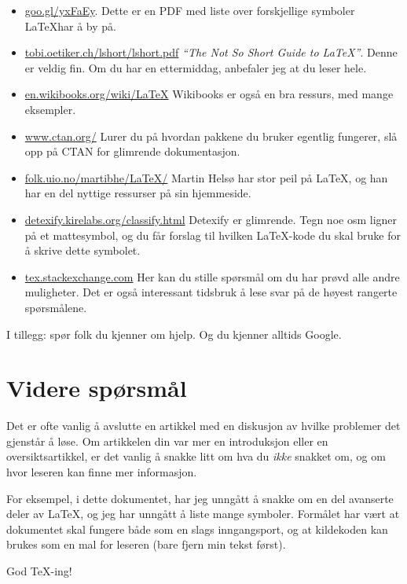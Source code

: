 \documentclass[a4paper, norsk]{article}  %
\begin{document}
\begin{itemize}
\item \url{goo.gl/yxFaEy}. Dette er en PDF med liste over forskjellige symboler \LaTeX har å by på.
\item \url{tobi.oetiker.ch/lshort/lshort.pdf} \emph{``The Not So Short Guide to \LaTeX''}. Denne er veldig fin. Om du har en ettermiddag, anbefaler jeg at du leser hele.
\item \url{en.wikibooks.org/wiki/LaTeX} Wikibooks er også en bra ressurs, med mange eksempler.
\item \url{www.ctan.org/} Lurer du på hvordan pakkene du bruker egentlig fungerer, slå opp på CTAN for glimrende dokumentasjon.
\item \url{folk.uio.no/martibhe/LaTeX/} Martin Helsø har stor peil på \LaTeX, og han har en del nyttige ressurser på sin hjemmeside. 
\item \url{detexify.kirelabs.org/classify.html}  Detexify er glimrende. Tegn noe osm ligner på et mattesymbol, og du får forslag til hvilken \LaTeX-kode du skal bruke for å skrive dette symbolet. 
\item \url{tex.stackexchange.com} Her kan du stille spørsmål om du har prøvd alle andre muligheter. Det er også interessant tidsbruk å lese svar på de høyest rangerte spørsmålene.
\end{itemize}

I tillegg: spør folk du kjenner om hjelp. Og du kjenner alltids Google.


\section{Videre spørsmål}
\label{seksjonslutt}

Det er ofte vanlig å avslutte en artikkel med en diskusjon av hvilke problemer det gjenstår å løse. Om artikkelen din var mer en introduksjon eller en oversiktsartikkel, er det vanlig å snakke litt om hva du \emph{ikke} snakket om, og om hvor leseren kan finne mer informasjon. 

For eksempel, i dette dokumentet, har jeg unngått å snakke om en del avanserte deler av \LaTeX, og jeg har unngått å liste mange symboler. Formålet har vært at dokumentet skal fungere både som en slags inngangsport, og at kildekoden kan brukes som en mal for leseren (bare fjern min tekst først).

God \TeX-ing!
\end{document}

